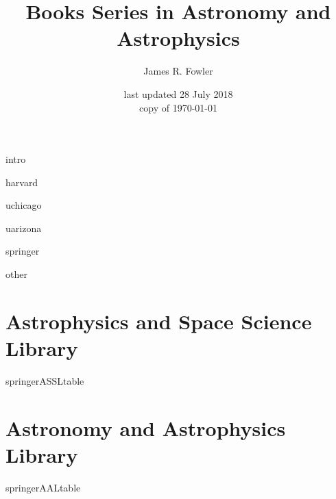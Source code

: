\documentclass[letterpaper]{article}
\begin{document}
\title{Books Series in Astronomy and Astrophysics}
\author{James R. Fowler}
\date{last updated 28 July 2018\\ copy of \today}

  \maketitle

\tableofcontents
\listoftables


{intro}

{harvard}

{uchicago}

{uarizona}

{springer}

{other}

\newpage
\appendixpage
\begin{appendix}

  \section{Astrophysics and Space Science Library}
  {springerASSLtable}

  \newpage
  \section{Astronomy and Astrophysics Library}
  {springerAALtable}
\end{appendix}
\end{document}
